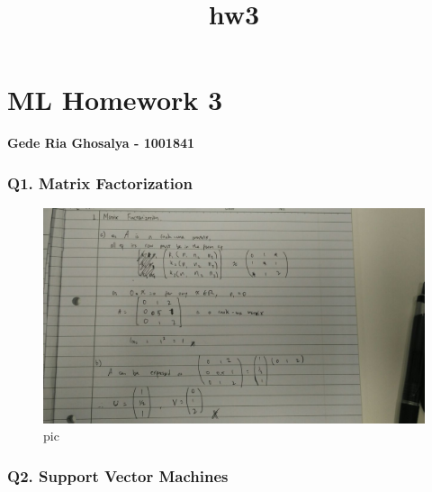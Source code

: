 \documentclass[11pt]{article}
\title{hw3}
\makeatletter
\def\maxwidth{\ifdim\Gin@nat@width>\linewidth\linewidth
    \else\Gin@nat@width\fi}
\let\Oldincludegraphics\includegraphics
\renewcommand{\includegraphics}[1]{\Oldincludegraphics[width=.8\maxwidth]{#1}}
\makeatother
\begin{document}
    
    
    \maketitle
    
    

    
    \section{ML Homework 3}\label{ml-homework-3}

\textbf{Gede Ria Ghosalya - 1001841}

    \subsubsection{Q1. Matrix Factorization}\label{q1.-matrix-factorization}

    \begin{figure}[htbp]
\centering
\includegraphics{factor.jpeg}
\caption{pic}
\end{figure}

    \subsubsection{Q2. Support Vector
Machines}\label{q2.-support-vector-machines}
\end{document}
